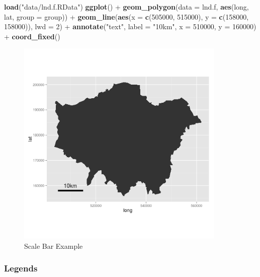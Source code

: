 \documentclass[]{article}
\newenvironment{Shaded}{}{}
\newcommand{\KeywordTok}[1]{\textcolor[rgb]{0.00,0.44,0.13}{\textbf{{#1}}}}
\newcommand{\DataTypeTok}[1]{\textcolor[rgb]{0.56,0.13,0.00}{{#1}}}
\newcommand{\DecValTok}[1]{\textcolor[rgb]{0.25,0.63,0.44}{{#1}}}
\newcommand{\StringTok}[1]{\textcolor[rgb]{0.25,0.44,0.63}{{#1}}}
\newcommand{\NormalTok}[1]{{#1}}
\let\Oldincludegraphics\includegraphics
\renewcommand{\includegraphics}[1]{\Oldincludegraphics[width=10cm]{#1}}
\begin{document}
\begin{Shaded}
\begin{Highlighting}[]
\KeywordTok{load}\NormalTok{(}\StringTok{"data/lnd.f.RData"}\NormalTok{)}
\KeywordTok{ggplot}\NormalTok{() + }\KeywordTok{geom_polygon}\NormalTok{(}\DataTypeTok{data =} \NormalTok{lnd.f, }\KeywordTok{aes}\NormalTok{(long, lat, }\DataTypeTok{group =} \NormalTok{group)) + }\KeywordTok{geom_line}\NormalTok{(}\KeywordTok{aes}\NormalTok{(}\DataTypeTok{x =} \KeywordTok{c}\NormalTok{(}\DecValTok{505000}\NormalTok{, }
    \DecValTok{515000}\NormalTok{), }\DataTypeTok{y =} \KeywordTok{c}\NormalTok{(}\DecValTok{158000}\NormalTok{, }\DecValTok{158000}\NormalTok{)), }\DataTypeTok{lwd =} \DecValTok{2}\NormalTok{) + }\KeywordTok{annotate}\NormalTok{(}\StringTok{"text"}\NormalTok{, }\DataTypeTok{label =} \StringTok{"10km"}\NormalTok{, }
    \DataTypeTok{x =} \DecValTok{510000}\NormalTok{, }\DataTypeTok{y =} \DecValTok{160000}\NormalTok{) + }\KeywordTok{coord_fixed}\NormalTok{()}
\end{Highlighting}
\end{Shaded}
\begin{figure}[htbp]
\centering
\includegraphics{figure/Scale_Bar_Example.png}
\caption{Scale Bar Example}
\end{figure}

\subsubsection{Legends}
\end{document}
